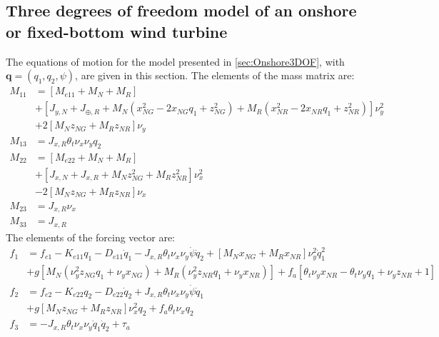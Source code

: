 \documentclass[wes, manuscript]{copernicus}
\renewcommand{\v}[1]{\boldsymbol{#1}}
\begin{document}
\subsection{Three degrees of freedom model of an onshore or fixed-bottom wind turbine}
\label{sec:Onshore3DOFEq}
The equations of motion for the model presented in \autoref{sec:Onshore3DOF}, with $\v{q}=(q_1,q_2,\psi)$, are given in this section.
The elements of the mass matrix are:
\begin{align}
    M_{11} &= \left[M_{e11}+ M_N + M_{R} \right]
        \\
       &+ \left[J_{y,N} + J_{\oplus,R} 
       + M_N\left(x_{NG}^{2} - 2 x_{NG} q_1 + z_{NG}^{2}\right)
       + M_{R} \left(x_{NR}^{2} - 2 x_{NR} q_1 + z_{NR}^{2}\right)
    \right] \nu_y^{2}
       \label{eq:GMEx1}
       \\
    &+ 2 \left[M_N z_{NG} + M_{R} z_{NR} \right]   \nu_{y} 
   \\
  M_{13} &= J_{x,R} \theta_t \nu_x \nu_y q_2
  \\
  M_{22} &= \left[M_{e22} + M_N + M_{R} \right]
  \\
         &+ \left[J_{x,N} + J_{x,R} + M_N z_{NG}^{2} + M_{R} z_{NR}^{2}\right] \nu_x^2
  \\
         & -2 \left[M_N z_{NG} + M_{R} z_{NR} \right]\nu_x
  \\
 M_{23} &= J_{x,R} \nu_x 
   \\
 M_{33} & =J_{x,R}
\end{align}
The elements of the forcing vector are:
\begin{align}
f_1 &=
   f_{e1}- K_{e11} q_1 - D_{e11} \dot{q}_1 - J_{x,R} \theta_t \nu_x \nu_y \dot{\psi} \dot{q}_2  
    + \left[M_N x_{NG} + M_{R}  x_{NR}\right] \nu_y^2 \dot{q}_1^{2}
    \\
   &+ g\left[
       M_N\left(\nu_y^{2} z_{NG} q_1 + \nu_y x_{NG}\right)
      +M_R\left(\nu_y^{2} z_{NR} q_1 + \nu_y x_{NR}\right)
           \right] 
    + f_a \left[\theta_t \nu_y x_{NR}  - \theta_t \nu_y q_1 + \nu_y z_{NR}  + 1\right]
\\ 
f_2 &=f_{e2} - K_{e22} q_2 - D_{e22} \dot{q}_2 + J_{x,R} \theta_t \nu_x \nu_y \dot{\psi} \dot{q}_1  
\\
    & +  g \left[M_N z_{NG} + M_{R} z_{NR} \right]\nu_x^{2} q_2 + f_a \theta_t \nu_x q_2
\\ 
f_3 &= - J_{x,R} \theta_t \nu_x \nu_y \dot{q}_1 \dot{q}_2 + \tau_a
\end{align}
\end{document}
